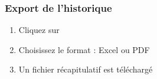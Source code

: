 \subsubsection{Export de l'historique}

\begin{enumerate}[leftmargin=*]
    \item Cliquez sur 
    \item Choisissez le format : Excel ou PDF
    \item Un fichier récapitulatif est téléchargé
\end{enumerate}

\newpage
